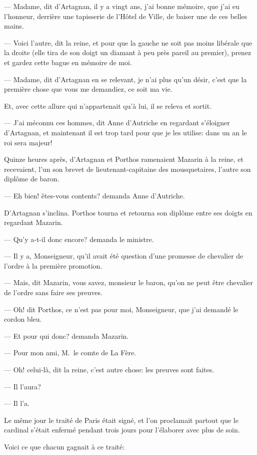 — Madame, dit d'Artagnan, il y a vingt ans, j'ai bonne mémoire, que j'ai eu l'honneur, derrière une tapisserie de l'Hôtel de Ville, de baiser une de ces belles mains.

— Voici l'autre, dit la reine, et pour que la gauche ne soit pas moins libérale que la droite (elle tira de son doigt un diamant à peu près pareil au premier), prenez et gardez cette bague en mémoire de moi.

— Madame, dit d'Artagnan en se relevant, je n'ai plus qu'un désir, c'est que la première chose que vous me demandiez, ce soit ma vie.

Et, avec cette allure qui n'appartenait qu'à lui, il se releva et sortit.

— J'ai méconnu ces hommes, dit Anne d'Autriche en regardant s'éloigner d'Artagnan, et maintenant il est trop tard pour que je les utilise: dans un an le roi sera majeur!

Quinze heures après, d'Artagnan et Porthos ramenaient Mazarin à la reine, et recevaient, l'un son brevet de lieutenant-capitaine des mousquetaires, l'autre son diplôme de baron.

— Eh bien! êtes-vous contents? demanda Anne d'Autriche.

D'Artagnan s'inclina. Porthos tourna et retourna son diplôme entre ses doigts en regardant Mazarin.

— Qu'y a-t-il donc encore? demanda le ministre.

— Il y a, Monseigneur, qu'il avait été question d'une promesse de chevalier de l'ordre à la première promotion.

— Mais, dit Mazarin, vous savez, monsieur le baron, qu'on ne peut être chevalier de l'ordre sans faire ses preuves.

— Oh! dit Porthos, ce n'est pas pour moi, Monseigneur, que j'ai demandé le cordon bleu.

— Et pour qui donc? demanda Mazarin.

— Pour mon ami, M.~le comte de La Fère.

— Oh! celui-là, dit la reine, c'est autre chose: les preuves sont faites.

— Il l'aura?

— Il l'a.

Le même jour le traité de Paris était signé, et l'on proclamait partout que le cardinal s'était enfermé pendant trois jours pour l'élaborer avec plus de soin.

Voici ce que chacun gagnait à ce traité:

